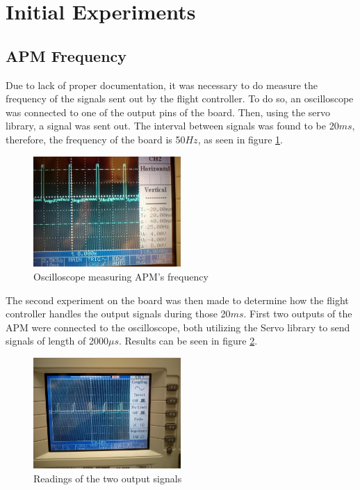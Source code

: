 \section{Initial Experiments}
\subsection{APM Frequency}
Due to lack of proper documentation, it was necessary to do measure the frequency of the signals sent out by the flight controller. To do so, an oscilloscope was connected to one of the output pins of the board. Then, using the servo library, a signal was sent out. The interval between signals was found to be 20$ms$, therefore, the frequency of the board is 50$Hz$, as seen in figure \ref{oscillo1}.
\begin{figure}[H]
  \centering
    \includegraphics[width=0.5\textwidth]{images/oscillo1.jpg}
	\caption{Oscilloscope measuring APM's frequency}
	\label{oscillo1}
\end{figure}

The second experiment on the board was then made to determine how the flight controller handles the output signals during those 20$ms$. First two outputs of the APM were connected to the oscilloscope, both utilizing the Servo library to send signals of length of 2000$\mu s$. Results can be seen in figure \ref{oscillo2}.
\begin{figure}[H]
  \centering
    \includegraphics[width=0.5\textwidth]{images/oscillo2.jpg}
	\caption{Readings of the two output signals}
	\label{oscillo2}
\end{figure}

